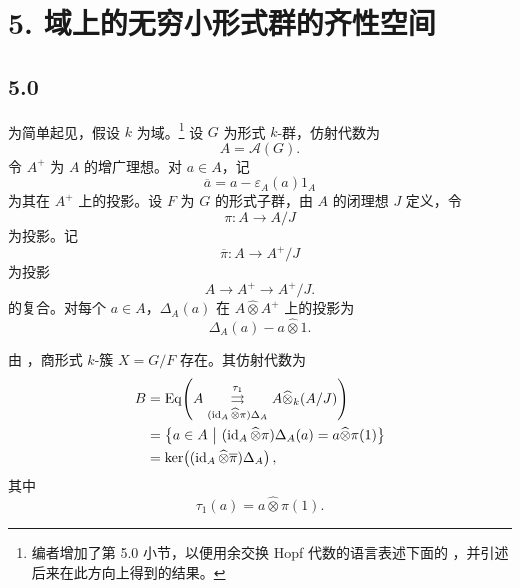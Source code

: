 
\section*{5. 域上的无穷小形式群的齐性空间}
\label{sga3:VIIB:5}

\subsection*{5.0}
\label{sga3:VIIB:5.0}

为简单起见，假设 \(k\) 为域。\footnote{%
\label{sga3:VIIB:nde:142}编者增加了第 5.0 小节，以便用余交换 Hopf 代数的语言表述下面的 ，并引述后来在此方向上得到的结果。}
设 \(G\) 为形式 \(k\)-群，仿射代数为
\[
  A=\mathscr A(G).
\]
令 \(A^+\) 为 \(A\) 的增广理想。对 \(a\in A\)，记
\[
  \overline a=a-\varepsilon_A(a)1_A
\]
为其在 \(A^+\) 上的投影。设 \(F\) 为 \(G\) 的形式子群，由 \(A\) 的闭理想 \(J\) 定义，令
\[
  \pi:A\longrightarrow A/J
\]
为投影。记
\[
  \overline\pi:A\longrightarrow A^+/J
\]
为投影
\[
  A\longrightarrow A^+\longrightarrow A^+/J.
\]
的复合。对每个 \(a\in A\)，\(\Delta_A(a)\) 在 \(A\widehat\otimes A^+\) 上的投影为
\[
  \Delta_A(a)-a\widehat\otimes1.
\]

由 ，商形式 \(k\)-簇 \(X=G/F\) 存在。其仿射代数为
\[
\begin{aligned}
  B
  &=
  \operatorname{Eq}\!\left(
    A
    \mathrel{\mathop{\rightrightarrows}^{\tau_1}_{%
      (\operatorname{id}_A\widehat\otimes\pi)\Delta_A}}
    A\widehat\otimes_k(A/J)
  \right)
  \\
  &=
  \left\{
    a\in A\ \middle|\
    (\operatorname{id}_A\widehat\otimes\pi)\Delta_A(a)
    =
    a\widehat\otimes\pi(1)
  \right\}
  \\
  &=
  \ker\!\left(
    (\operatorname{id}_A\widehat\otimes\overline\pi)\Delta_A
  \right),
\end{aligned}
\]
其中
\[
  \tau_1(a)=a\widehat\otimes\pi(1).
\]

